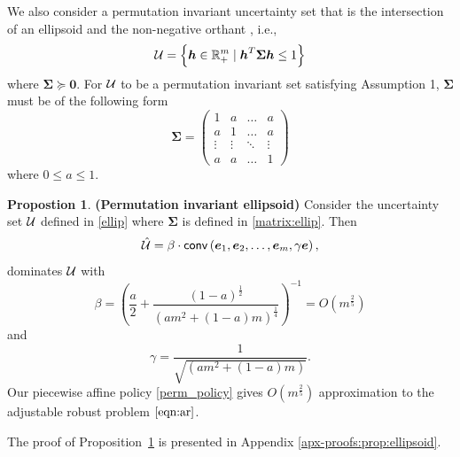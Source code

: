 \documentclass[11pt]{article}
\theoremstyle{plain}
\theoremstyle{definition}
\newtheorem{prop}[theorem]{Propostion}
\numberwithin{equation}{section}%
\numberwithin{equation}{section}%
\newcommand{\mb}[1]{\ensuremath{\boldsymbol{#1}}}
\begin{document}
We also consider a permutation invariant uncertainty set that is the intersection of  an ellipsoid and the non-negative orthant , i.e.,
\begin{equation} \label{ellip}
{\cal U}=\left\{\mb{h}\in{\mathbb R}^{m}_+\;|\;   \mb{h}^T \mb \Sigma  \mb{h}       \leq 1\right\}
\end{equation}
where $\mb \Sigma \succeq \mb 0$. For ${\cal U}$ to be a permutation invariant set satisfying Assumption 1, $\mb {\Sigma}$ must be of the following form
\begin{equation} \label{matrix:ellip}
 \mb \Sigma= \left(
\begin{matrix}
1 &  a & \ldots & a\\
a &  1 & \ldots & a\\
\vdots & \vdots & \ddots & \vdots\\
a  &   a       &\ldots & 1
\end{matrix}
\right)
\end{equation}
where $ 0\leq a \leq 1$.

\begin{prop} {\bf (Permutation invariant ellipsoid)} \label{prop:ellipsoid}
Consider the uncertainty set  ${\cal U}$  defined in \eqref{ellip} where  $\mb \Sigma$ is defined in \eqref{matrix:ellip}.
 Then
 \[\hat{\cal U}=\beta\cdot{\sf conv}\left(\mb{e}_1, \mb{e}_2,\ldots, \mb{e}_m, \gamma\mb{e} \right),\]
dominates ${\cal U}$ with $$\beta=   \left(  \frac{a}{2}+ \frac{(1-a)^{\frac{1}{2}}}{\left( am^2+(1-a)m\right)^{\frac{1}{4}}}\right)^{-1}= O \left(  m^{\frac{2}{5}} \right)  $$
 and $$ \gamma = \frac{1}{ \sqrt{\left( am^2+(1-a)m \right)}  } .   $$
 Our piecewise affine policy  \eqref{perm_policy} gives $ O \left(  m^{\frac{2}{5}} \right)  $ approximation to the adjustable robust problem $\eqref{eqn:ar}$.
\end{prop}
The proof of Proposition~\ref{prop:ellipsoid} is presented in Appendix \ref{apx-proofs:prop:ellipsoid}.
\end{document}
